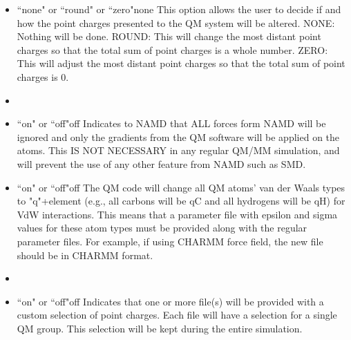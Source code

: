 \begin{itemize}
\item
{}%
{``none" or ``round" or ``zero"}{none}{%
This option allows the user to decide if and how the point charges 
presented to the QM system will be altered. NONE: Nothing will be done. 
ROUND: This will change the most distant point charges so that the 
total sum of point charges is a whole number. ZERO: This will adjust 
the most distant point charges so that the total sum of point charges 
is 0.
}

\item
{}

\item
{}%
{``on" or ``off"}{off}{%
Indicates to NAMD that ALL forces form NAMD will be ignored and 
only the gradients from the QM software will be applied on the atoms. 
This IS NOT NECESSARY in any regular QM/MM simulation, and will prevent 
the use of any other feature from NAMD such as SMD.
}

\item
{}%
{``on" or ``off"}{off}{%
The QM code will change all QM atoms' van der Waals types to "q"+element 
(e.g., all carbons will be qC and all hydrogens will be qH)
for VdW interactions. This means that a parameter file with 
epsilon and sigma values for these  atom types must be provided 
along with the regular parameter files. For example, if using 
CHARMM force field, the new file should be in CHARMM format.
}

\item
{}

\item
{}%
{``on" or ``off"}{off}{%
Indicates that one or more file(s) will be provided with a custom 
selection of point charges. Each file will have a selection for a single
QM group. This selection will be kept during the entire simulation.
}


\end{itemize}
